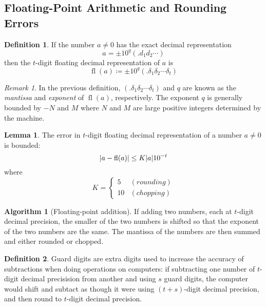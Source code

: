 \documentclass[11pt,letterpaper]{article}
\numberwithin{figure}{section} %
\newcommand{\keyword}[1]{\colorbox{cyan!20!}{#1}}
\DeclareMathOperator{\fl}{fl}
\theoremstyle{definition}
\theoremstyle{definition}
\theoremstyle{definition}
\newtheorem{lemma}{Lemma}[subsection]
\theoremstyle{definition}
\newtheorem{definition}{Definition}[subsection]
\theoremstyle{definition}
\theoremstyle{remark}
\newtheorem*{remark}{Remark}
\theoremstyle{remark}
\theoremstyle{definition}
\newtheorem*{algorithm}{Algorithm}
\theoremstyle{remark}
\theoremstyle{remark}
\begin{document}
\begin{multicols*}{3}
\subsection{Floating-Point Arithmetic and Rounding Errors}
\begin{definition}
	If the number $a \neq 0$ has the exact decimal representation
	\[
		a = \pm 10^q(.d_1 d_2 \cdots)
	\]
	then the \keyword{$t$-digit floating decimal representation} of $a$ is 
	\[
		\fl(a) \coloneqq \pm 10^q(.\delta_1 \delta_2 \cdots \delta_t)
	\]
\end{definition}
\begin{remark}
	In the previous definition, $(.\delta_1 \delta_2 \cdots \delta_t)$ and $q$
	are known as the \textit{mantissa} and \textit{exponent} of $\fl(a)$,
	respectively. The exponent $q$ is generally bounded by $-N$ and $M$ where
	$N$ and $M$ are large positive integers determined by the machine.
\end{remark}
\begin{lemma}
	The error in $t$-digit floating decimal representation of a number $a\neq 0$
	is bounded:
	\[
		\abs{a - \fl(a)} \leq K \abs{a} 10^{-t}
	\]
	where
	\[
		K = 
		\begin{cases*}
			5 & (rounding) \\
			10 & (chopping)
		\end{cases*}
	\]
\end{lemma}
\begin{algorithm}[Floating-point addition]
	If adding two numbers, each at $t$-digit decimal precision, the smaller of
	the two numbers is shifted so that the exponent of the two numbers are the
	same. The mantissa of the numbers are then summed and either rounded or
	chopped.
\end{algorithm}
\begin{definition}
	\keyword{Guard digits} are extra digits used to increase the accuracy of
	subtractions when doing operations on computers: if subtracting one number of
	$t$-digit decimal precisision from another and using $s$ guard digits, the
	computer would shift and subtact as though it were using $(t+s)$-digit
	decimal precision, and then round to $t$-digit decimal precision.
\end{definition}

\end{multicols*}
\end{document}
